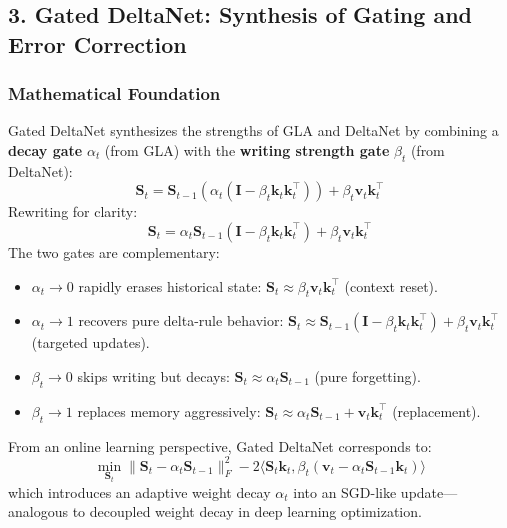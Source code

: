 \subsection{3. Gated DeltaNet: Synthesis of Gating and Error Correction}

\subsubsection{Mathematical Foundation}

Gated DeltaNet \citep{yang_gated_deltanet_2024} synthesizes the strengths of GLA and DeltaNet by combining a \textbf{decay gate} $\alpha_t$ (from GLA) with the \textbf{writing strength gate} $\beta_t$ (from DeltaNet):
\[
\mathbf{S}_t = \mathbf{S}_{t-1}\left(\alpha_t (\mathbf{I} - \beta_t \mathbf{k}_t \mathbf{k}_t^\top)\right) + \beta_t \mathbf{v}_t \mathbf{k}_t^\top
\]
Rewriting for clarity:
\[
\mathbf{S}_t = \alpha_t \mathbf{S}_{t-1}(\mathbf{I} - \beta_t \mathbf{k}_t \mathbf{k}_t^\top) + \beta_t \mathbf{v}_t \mathbf{k}_t^\top
\]
The two gates are complementary:
\begin{itemize}[leftmargin=*]
    \item $\alpha_t \to 0$ rapidly erases historical state: $\mathbf{S}_t \approx \beta_t \mathbf{v}_t \mathbf{k}_t^\top$ (context reset).
    \item $\alpha_t \to 1$ recovers pure delta-rule behavior: $\mathbf{S}_t \approx \mathbf{S}_{t-1}(\mathbf{I} - \beta_t \mathbf{k}_t \mathbf{k}_t^\top) + \beta_t \mathbf{v}_t \mathbf{k}_t^\top$ (targeted updates).
    \item $\beta_t \to 0$ skips writing but decays: $\mathbf{S}_t \approx \alpha_t \mathbf{S}_{t-1}$ (pure forgetting).
    \item $\beta_t \to 1$ replaces memory aggressively: $\mathbf{S}_t \approx \alpha_t \mathbf{S}_{t-1} + \mathbf{v}_t \mathbf{k}_t^\top$ (replacement).
\end{itemize}

From an online learning perspective, Gated DeltaNet corresponds to:
\[
\min_{\mathbf{S}_t} \|\mathbf{S}_t - \alpha_t \mathbf{S}_{t-1}\|_F^2 - 2\langle \mathbf{S}_t \mathbf{k}_t, \beta_t(\mathbf{v}_t - \alpha_t \mathbf{S}_{t-1} \mathbf{k}_t)\rangle
\]
which introduces an adaptive weight decay $\alpha_t$ into an SGD-like update---analogous to decoupled weight decay in deep learning optimization.

